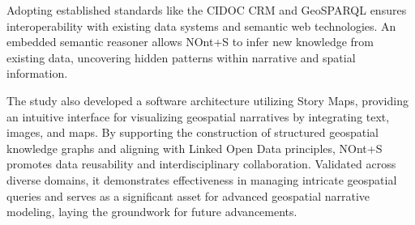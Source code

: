 Adopting established standards like the CIDOC CRM and GeoSPARQL ensures interoperability with existing data systems and semantic web technologies. An embedded semantic reasoner allows NOnt+S to infer new knowledge from existing data, uncovering hidden patterns within narrative and spatial information.

The study also developed a software architecture utilizing Story Maps, providing an intuitive interface for visualizing geospatial narratives by integrating text, images, and maps. By supporting the construction of structured geospatial knowledge graphs and aligning with Linked Open Data principles, NOnt+S promotes data reusability and interdisciplinary collaboration. Validated across diverse domains, it demonstrates effectiveness in managing intricate geospatial queries and serves as a significant asset for advanced geospatial narrative modeling, laying the groundwork for future advancements.

